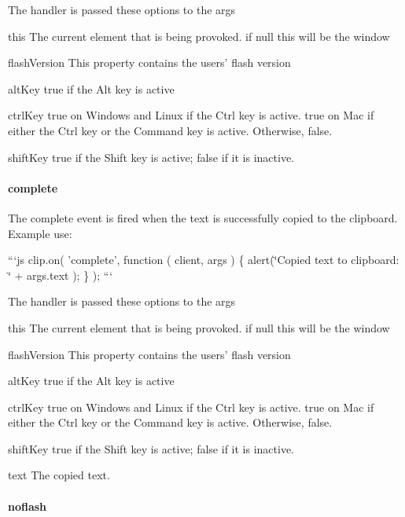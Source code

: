 The handler is passed these options to the {\ttfamily args}


\begin{DoxyDescription}
\item[this ]The current element that is being provoked. if null this will be the window 
\item[flash\-Version ]This property contains the users' flash version 
\item[alt\-Key ]{\ttfamily true} if the Alt key is active 
\item[ctrl\-Key ]{\ttfamily true} on Windows and Linux if the Ctrl key is active. {\ttfamily true} on Mac if either the Ctrl key or the Command key is active. Otherwise, {\ttfamily false}. 
\item[shift\-Key ]{\ttfamily true} if the Shift key is active; {\ttfamily false} if it is inactive. 
\end{DoxyDescription}

\paragraph*{complete}

The {\ttfamily complete} event is fired when the text is successfully copied to the clipboard. Example use\-:

```js clip.\-on( 'complete', function ( client, args ) \{ alert(\char`\"{}\-Copied text to clipboard\-: \char`\"{} + args.\-text ); \} ); ```

The handler is passed these options to the {\ttfamily args}


\begin{DoxyDescription}
\item[this ]The current element that is being provoked. if null this will be the window 
\item[flash\-Version ]This property contains the users' flash version 
\item[alt\-Key ]{\ttfamily true} if the Alt key is active 
\item[ctrl\-Key ]{\ttfamily true} on Windows and Linux if the Ctrl key is active. {\ttfamily true} on Mac if either the Ctrl key or the Command key is active. Otherwise, {\ttfamily false}. 
\item[shift\-Key ]{\ttfamily true} if the Shift key is active; {\ttfamily false} if it is inactive. 
\item[text ]The copied text. 
\end{DoxyDescription}

\paragraph*{noflash}

